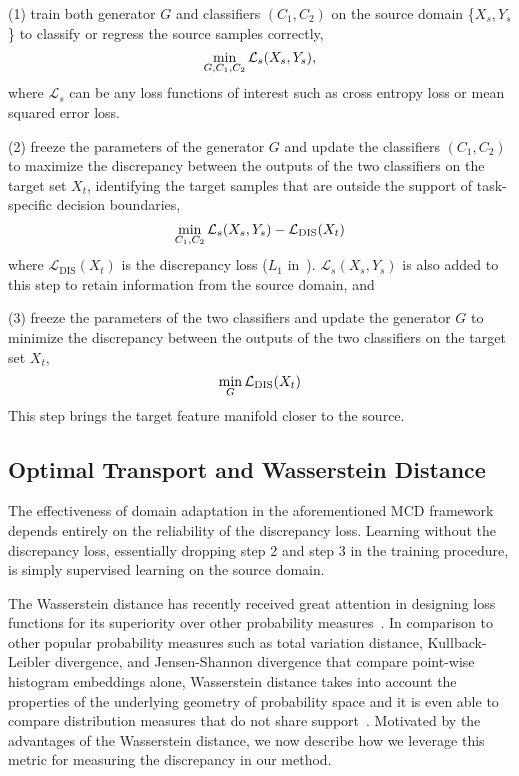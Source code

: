 \documentclass[10pt,twocolumn,letterpaper]{article}
\begin{document}
\noindent
(1) train both generator $G$ and classifiers $(C_1, C_2)$ on the source domain \{$X_{s}, Y_{s}$\} to classify or regress the source samples correctly,
 \begin{equation}
 \small
   \min_{G, C_1, C_2} \mathcal{L}_s (X_{s},Y_{s}),
 \end{equation}
where $ \mathcal{L}_s$ can be any loss functions of interest such as cross entropy loss or mean squared error loss.

\noindent
(2) freeze the parameters of the generator $G$ and update the classifiers $(C_1, C_2)$ to maximize the discrepancy between the outputs of the two classifiers on the target set $X_{t}$, identifying the target samples that are outside the support of task-specific decision boundaries, 
 \begin{equation}
  \small
  \min_{C_1, C_2} \mathcal{L}_s (X_{s},Y_{s}) - \mathcal{L}_{\text{DIS}}(X_{t})
 \end{equation}
 where $ \mathcal{L}_{\text{DIS}}(X_{t})$ is the discrepancy loss ($L_1$ in~\cite{saito2017maximum}). $\mathcal{L}_s (X_{s},Y_{s})$ is also added to this step to retain information from the source domain, and

\noindent
(3) freeze the parameters of the two classifiers and update the generator $G$ to minimize the discrepancy between the outputs of the two classifiers on the target set $X_{t}$,
 \begin{equation}
   \small
  \min_{G} \mathcal{L}_{\text{DIS}}(X_{t})
 \end{equation}
 This step brings the target feature manifold closer to the source.



\subsection{Optimal Transport and Wasserstein Distance}
\label{sec:ot}
The effectiveness of domain adaptation in the aforementioned MCD framework depends entirely on the reliability of the discrepancy loss. Learning without the discrepancy loss, essentially dropping step 2 and step 3 in the training procedure, is simply supervised learning on the source domain. 

The Wasserstein distance has recently received great attention in designing loss functions for its superiority over other probability measures~\cite{wu2018wasserstein, mi2018variational}.
In comparison to other popular probability measures such as total variation distance, Kullback-Leibler divergence, and Jensen-Shannon divergence that compare point-wise histogram embeddings alone, Wasserstein distance takes into account the properties of the underlying geometry of probability space and it is even able to compare distribution measures that do not share support~\cite{arjovsky2017wasserstein}.
Motivated by the advantages of the Wasserstein distance, we now describe how we leverage this metric for measuring the discrepancy in our method.
\end{document}
